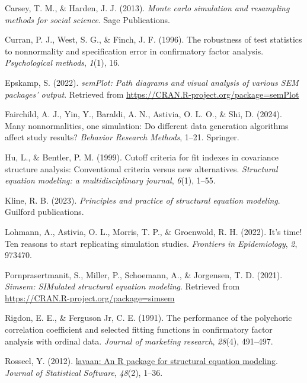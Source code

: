 \documentclass[
  letterpaper,
  DIV=11,
  numbers=noendperiod]{scrartcl}
\newlength{\cslhangindent}
\newenvironment{CSLReferences}[2] %
 {\begin{list}{}{%
  \setlength{\itemindent}{0pt}
  \setlength{\leftmargin}{0pt}
  \setlength{\parsep}{0pt}
  \ifodd #1
   \setlength{\leftmargin}{\cslhangindent}
   \setlength{\itemindent}{-1\cslhangindent}
  \fi
  \setlength{\itemsep}{#2\baselineskip}}}
 {\end{list}}
\begin{document}
\label{refs}
\begin{CSLReferences}{1}{0}
Carsey, T. M., \& Harden, J. J. (2013). \emph{Monte carlo simulation and
resampling methods for social science}. Sage Publications.

Curran, P. J., West, S. G., \& Finch, J. F. (1996). The robustness of
test statistics to nonnormality and specification error in confirmatory
factor analysis. \emph{Psychological methods}, \emph{1}(1), 16.

Epskamp, S. (2022). \emph{semPlot: Path diagrams and visual analysis of
various SEM packages' output}. Retrieved from
\url{https://CRAN.R-project.org/package=semPlot}

Fairchild, A. J., Yin, Y., Baraldi, A. N., Astivia, O. L. O., \& Shi, D.
(2024). Many nonnormalities, one simulation: Do different data
generation algorithms affect study results? \emph{Behavior Research
Methods}, 1--21. Springer.

Hu, L., \& Bentler, P. M. (1999). Cutoff criteria for fit indexes in
covariance structure analysis: Conventional criteria versus new
alternatives. \emph{Structural equation modeling: a multidisciplinary
journal}, \emph{6}(1), 1--55.

Kline, R. B. (2023). \emph{Principles and practice of structural
equation modeling}. Guilford publications.

Lohmann, A., Astivia, O. L., Morris, T. P., \& Groenwold, R. H. (2022).
It's time! Ten reasons to start replicating simulation studies.
\emph{Frontiers in Epidemiology}, \emph{2}, 973470.

Pornprasertmanit, S., Miller, P., Schoemann, A., \& Jorgensen, T. D.
(2021). \emph{Simsem: SIMulated structural equation modeling}. Retrieved
from \url{https://CRAN.R-project.org/package=simsem}

Rigdon, E. E., \& Ferguson Jr, C. E. (1991). The performance of the
polychoric correlation coefficient and selected fitting functions in
confirmatory factor analysis with ordinal data. \emph{Journal of
marketing research}, \emph{28}(4), 491--497.

Rosseel, Y. (2012).
\href{https://doi.org/10.18637/jss.v048.i02}{{lavaan}: An {R} package
for structural equation modeling}. \emph{Journal of Statistical
Software}, \emph{48}(2), 1--36.


\end{CSLReferences}
\end{document}
